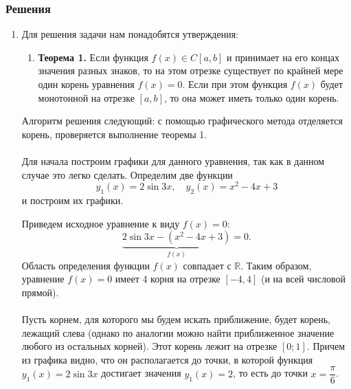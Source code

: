 \documentclass[a4paper, 12pt]{article}
\newcommand{\Rm}{\mathbb{R}}
\begin{document}
	\subsubsection*{Решения}
	\begin{enumerate}
		\item \hypertarget{t1}{}
		 Для решения задачи нам понадобятся утверждения:
		 \begin{enumerate}
		 	\item \textbf{Теорема 1.} Если функция $f(x)\in C[a,b]$ и принимает на его концах значения разных знаков, то на этом отрезке существует по крайней мере один корень уравнения $f(x) = 0$.
		 	Если при этом функция $f(x)$ будет монотонной на отрезке $[a,b]$, то она может иметь только один корень.
		 \end{enumerate}
		 Алгоритм решения следующий: с помощью графического метода отделяется корень, проверяется выполнение теоремы 1.\\\\
		 Для начала построим графики для данного уравнения, так как в данном случае это легко сделать. Определим две функции $$y_1(x) = 2\sin 3x,\quad y_2(x) = x^2 - 4x+3$$ и построим их графики.
		 \begin{center}\end{center}
		 Приведем исходное уравнение к виду $f(x) = 0$: $$\underbrace{2\sin 3x - (x^2 - 4x+3)}_{f(x)} = 0.$$
		 Область определения функции $f(x)$ совпадает с $\Rm$.
		 Таким образом, уравнение $f(x)=0$ имеет 4 корня на отрезке $[-4,4]$ (и на всей числовой прямой). \\\\
		 Пусть корнем, для которого мы будем искать приближение, будет корень, лежащий слева (однако по аналогии можно найти приближенное значение любого из остальных корней). Этот корень лежит на отрезке $[0; 1]$. Причем из графика видно, что он располагается до точки, в которой функция $y_1(x) = 2\sin3x$ достигает значения $y_1(x) = 2$, то есть до точки $x = \dfrac\pi6$.

\end{enumerate}
\end{document}
